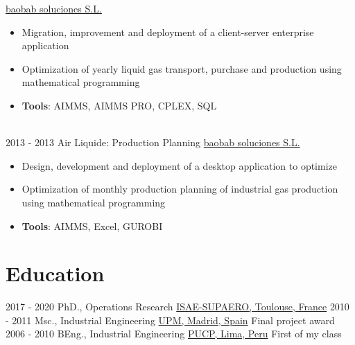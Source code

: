 \documentclass[letterpaper]{twentysecondcv} %
\begin{document}
\begin{twenty}
        {\href{https://baobabsoluciones.es/en/}{baobab soluciones S.L.}}
        {}
        {
        {\begin{itemize}
        \item Migration, improvement and deployment of a client-server enterprise application
        \item Optimization of yearly liquid gas transport, purchase and production using mathematical programming
        \item \textbf{Tools}: AIMMS, AIMMS PRO, CPLEX, SQL
        \vspace{2mm}
    \end{itemize}}
        }
  \\
  \twentyitem
      {2013 - 2013 }
    {}
        {Air Liquide: Production Planning}
        {\href{https://baobabsoluciones.es/en/}{baobab soluciones S.L.}}
        {}
        {
        {\begin{itemize}
        \item Design, development and deployment of a desktop application to optimize
        \item Optimization of monthly production planning of industrial gas production using mathematical programming
        \item \textbf{Tools}: AIMMS, Excel, GUROBI
        \vspace{2mm}
    \end{itemize}}
        }
\end{twenty}
\vspace{-0.5cm}
\section{Education}

\begin{twenty} %
  \twentyitemshorttest
      {2017 - 2020}
        {}
        {PhD., Operations Research}
        {\href{https://www.isae-supaero.fr/en/}{ISAE-SUPAERO, Toulouse, France}}
        {}   
  \twentyitemshorttest
      {2010 - 2011}
    {}
        {Msc., Industrial Engineering}
        {\href{https://www.upm.es/internacional}{UPM, Madrid, Spain}}
        {Final project award}
  \twentyitemshorttest
      {2006 - 2010}
    {}
        {BEng., Industrial Engineering}
        {\href{https://www.pucp.edu.pe/}{PUCP, Lima, Peru}}
        {First of my class}
\end{twenty}
\end{document}
